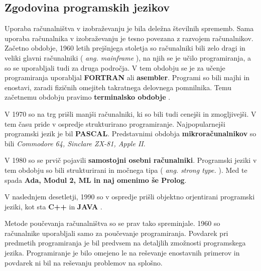 
\subsection{Zgodovina programskih jezikov}
\label{sec:zgodovina_programskih_jezikov}




Uporaba računalništva v izobraževanju je bila deležna številnih
sprememb. Sama uporaba računalnika v izobraževanju je tesno povezana z
razvojem računalnikov.  Začetno obdobje, 1960 letih prejšnjega
stoletja so računalniki bili zelo dragi in veliki glavni računalniki (
\emph{ang. mainframe} ), na njih se je učilo programiranja, a so se
uporabljali tudi za druga področja.  V tem obdobju se je za učenje
programiranja uporabljal \textbf{FORTRAN} ali
\textbf{asembler}. Programi so bili majhi in enostavi, zaradi fizičnih
omejiteh takratnega delovnega pomnilnika. Temu začetnemu obdobju pravimo
\textbf{terminalsko obdobje} \cite{gerlic_2000}.

V 1970 so na trg prišli manjši računalniki, ki so bili tudi cenejši in
zmogljivejši. V tem času pride v ospredje strukturirano programiranje.
Najpopularnejši programski jezik je bil \textbf{PASCAL}. Predstavnimi
obdobja \textbf{mikroračunalnikov} so bili \emph{Commodore 64,
  Sinclare ZX-81, Apple II}.

V 1980 so se prvič pojavili \textbf{samostojni osebni računalniki}. Programski
jeziki v tem obdobju so bili strukturirani in močnega tipa (
\emph{ang.  strong type.} ). Med te spada \textbf{Ada, Modul 2, ML in
  naj omenimo še Prolog}.

V naslednjem desetletji, 1990 so v ospredje prišli objektno
orjentirani programski jeziki, kot sta \textbf{C++} in \textbf{JAVA}
\cite{thesisAWebP}.





Metode poučevanja računalništva so se prav tako spreminjale. 1960 so
računalnike uporabljali samo za poučevanje programiranja. Povdarek pri
predmetih programiranja je bil predvsem na detaljlih zmožnosti
programskega jezika. Programiranje je bilo omejeno le na reševanje
enostavnih primerov in povdarek ni bil na reševanju problemov na
splošno.

